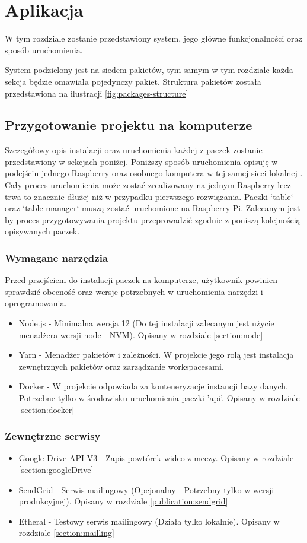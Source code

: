 \chapter{Aplikacja}
\label{ch:application}
W tym rozdziale zostanie przedstawiony system, jego główne funkcjonalności oraz sposób uruchomienia.

System podzielony jest na siedem pakietów, tym samym w tym rozdziale każda sekcja będzie omawiała pojedynczy pakiet. Struktura pakietów została przedstawiona na ilustracji \ref{fig:packages-structure}

\section{Przygotowanie projektu na komputerze}
Szczegółowy opis instalacji oraz uruchomienia każdej z paczek zostanie przedstawiony w sekcjach poniżej.
Poniższy sposób uruchomienia opisuję w podejściu jednego Raspberry oraz osobnego komputera w tej samej sieci lokalnej . Cały proces uruchomienia może zostać zrealizowany na jednym Raspberry lecz trwa to znacznie dłużej niż w przypadku pierwszego rozwiązania. Paczki `table` oraz `table-manager` muszą zostać uruchomione na Raspberry Pi. Zalecanym jest by proces przygotowywania projektu przeprowadzić zgodnie z poniszą kolejnością opisywanych paczek.

\subsection{Wymagane narzędzia}
Przed przejściem do instalacji paczek na komputerze, użytkownik powinien sprawdzić obecność oraz wersje potrzebnych w uruchomienia narzędzi i oprogramowania.

\begin{itemize}
	\item Node.js - Minimalna wersja 12 (Do tej instalacji zalecanym jest użycie menadżera wersji node - NVM). Opisany w rozdziale \ref{section:node}
	\item Yarn - Menadżer pakietów i zależności. W projekcie jego rolą jest instalacja zewnętrznych pakietów oraz zarządzanie workspacesami.
	\item Docker - W projekcie odpowiada za konteneryzacje instancji bazy danych. Potrzebne tylko w środowisku uruchomienia paczki 'api'. Opisany w rozdziale \ref{section:docker}
\end{itemize}

\label{subsection:externalServices}
\subsection{Zewnętrzne serwisy}
\begin{itemize}
	\item Google Drive API V3 - Zapis powtórek wideo z meczy. Opisany w rozdziale \ref{section:googleDrive}
	\item SendGrid - Serwis mailingowy (Opcjonalny - Potrzebny tylko w wersji produkcyjnej). Opisany w rozdziale \ref{publication:sendgrid}
	\item Etheral - Testowy serwis mailingowy (Działa tylko lokalnie). Opisany w rozdziale \ref{section:mailling}
\end{itemize}

